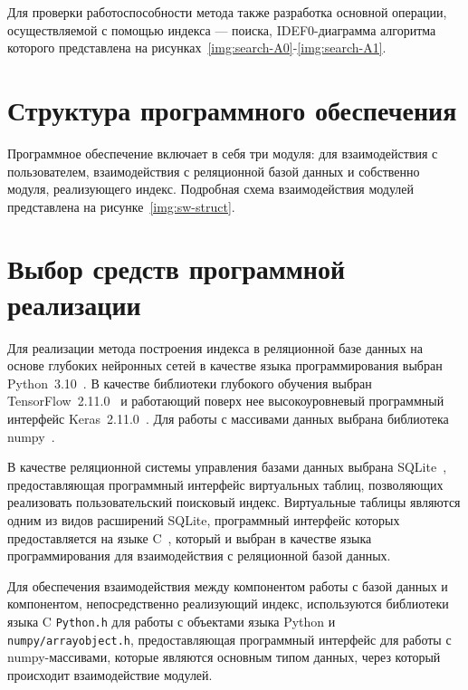
Для проверки работоспособности метода также разработка основной операции,
осуществляемой с помощью индекса --- поиска, IDEF0-диаграмма алгоритма которого
представлена на рисунках~\ref{img:search-A0}-\ref{img:search-A1}.


\section{Структура программного обеспечения}

Программное обеспечение включает в себя три модуля: для взаимодействия с
пользователем, взаимодействия с реляционной базой данных и собственно модуля,
реализующего индекс. Подробная схема взаимодействия модулей представлена на
рисунке~\ref{img:sw-struct}.


\section{Выбор средств программной реализации}

Для реализации метода построения индекса в реляционной базе данных на основе
глубоких нейронных сетей в качестве языка программирования выбран
Python~3.10~\cite{python}.  В качестве библиотеки глубокого обучения выбран
TensorFlow~2.11.0~\cite{tf} и работающий поверх нее высокоуровневый программный
интерфейс Keras~2.11.0~\cite{keras}.  Для работы с массивами данных выбрана
библиотека numpy~\cite{numpy}.

В качестве реляционной системы управления базами данных выбрана
SQLite~\cite{sqlite}, предоставляющая программный интерфейс виртуальных таблиц,
позволяющих реализовать пользовательский поисковый индекс. Виртуальные таблицы
являются одним из видов расширений SQLite, программный интерфейс которых
предоставляется на языке C~\cite{c}, который и выбран в качестве языка
программирования для взаимодействия с реляционной базой данных.

Для обеспечения взаимодействия между компонентом работы с базой данных и
компонентом, непосредственно реализующий индекс, используются библиотеки языка C
\texttt{Python.h} для работы с объектами языка Python и
\texttt{numpy/arrayobject.h}, предоставляющая программный интерфейс для работы с
numpy-массивами, которые являются основным типом данных, через который
происходит взаимодействие модулей.

